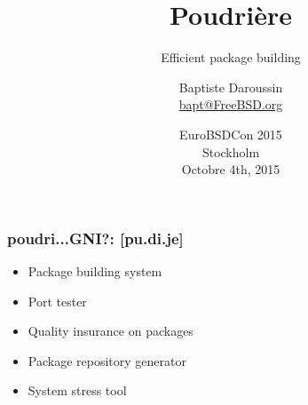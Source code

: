 
\usepackage{color}
\usepackage{listings}
\usepackage{tipa}
\usepackage{svg}
\newcommand{\prestitle}{EuroBSDCon 2015}
\lstset{
	numbers=none,
	frame=l,
	aboveskip=0pt, belowskip=0pt
}

\title{Poudrière}
\subtitle{Efficient package building}
\author{Baptiste Daroussin \\ \url{bapt@FreeBSD.org}}
\date{EuroBSDCon 2015 \\ Stockholm \\ Octobre 4th, 2015}


\begin{frame}[plain]
	\titlepage
\end{frame}

\begin{frame}
	\frametitle{poudri...GNI?: [pu.d\textipa{\textinvscr}i.je\textipa{\textinvscr}]}
	\begin{itemize}
		\item Package building system
		\item Port tester
		\item Quality insurance on packages
		\item Package repository generator
		\item System stress tool
	\end{itemize}
\end{frame}

